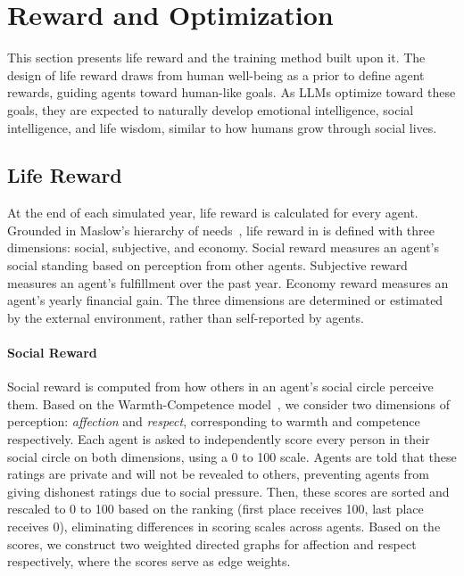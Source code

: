
\section{Reward and Optimization}
\label{sec:reward}

This section presents life reward and the training method built upon it.
The design of life reward draws from human well-being as a prior to define agent rewards, guiding agents toward human-like goals.
As LLMs optimize toward these goals, they are expected to naturally develop emotional intelligence, social intelligence, and life wisdom, similar to how humans grow through social lives.

\subsection{Life Reward}
\label{sec:life_reward}

At the end of each simulated year, life reward is calculated for every agent.
Grounded in Maslow's hierarchy of needs~\citep{maslow1943theory}, life reward in \method is defined with three dimensions: social, subjective, and economy.
Social reward measures an agent's social standing based on perception from other agents.
Subjective reward measures an agent's fulfillment over the past year.
Economy reward measures an agent's yearly financial gain.
The three dimensions are determined or estimated by the external environment, rather than self-reported by agents.

\paragraph{Social Reward}
Social reward is computed from how others in an agent's social circle perceive them.
Based on the Warmth-Competence model~\citep{fiske2007universal}, we consider two dimensions of perception: \textit{affection} and \textit{respect}, corresponding to warmth and competence respectively.
Each agent is asked to independently score every person in their social circle on both dimensions, using a 0 to 100 scale.
Agents are told that these ratings are private and will not be revealed to others, preventing agents from giving dishonest ratings due to social pressure.
Then, these scores are sorted and rescaled to 0 to 100 based on the ranking (first place receives 100, last place receives 0), eliminating differences in scoring scales across agents.
Based on the scores, we construct two weighted directed graphs for affection and respect respectively, where the scores serve as edge weights.

